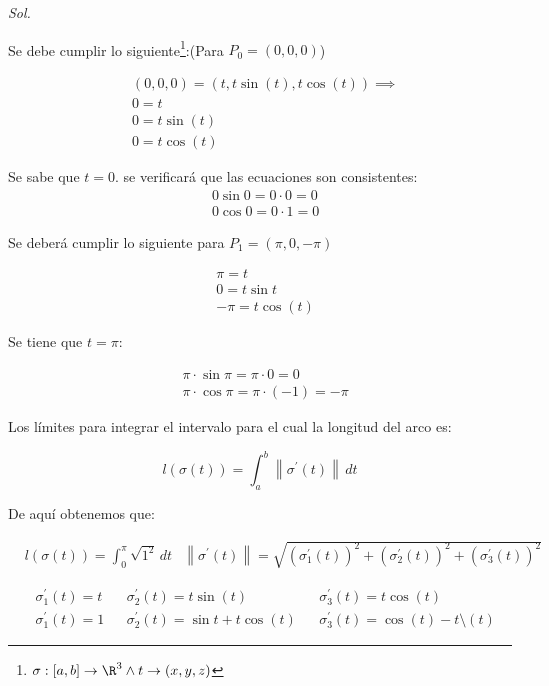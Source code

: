 \textit{ Sol. }

Se debe cumplir lo siguiente\footnote{$\sigma:\left[a,b\right]\to \R^3\land t\to (x,y,z)$}:(Para $P_0=(0,0,0)$)

\begin{align*}
	 & (0,0,0)=\left(t,t\sin{(t)},t\cos{(t)}\right)\implies \\
	 & 0=t                                                  \\
	 & 0=t\sin{(t)}                                         \\
	 & 0=t\cos{(t)}
\end{align*}

Se sabe que $t=0$. se verificará que las ecuaciones son consistentes:
\begin{align*}
	 & 0\sin{0}=0\cdot 0=0 \\
	 & 0\cos{0}=0\cdot 1=0
\end{align*}

Se deberá cumplir lo siguiente para $P_1=(\pi,0,-\pi)$

\begin{align*}
	 & \pi=t           \\
	 & 0=t\sin{t}      \\
	 & -\pi=t\cos{(t)}
\end{align*}

Se tiene que $t=\pi$:

\begin{align*}
	 & \pi\cdot \sin{\pi}=\pi\cdot 0=0      \\
	 & \pi\cdot \cos{\pi}=\pi\cdot(-1)=-\pi
\end{align*}

Los límites para integrar el intervalo para el cual la longitud del arco es:

\begin{equation}
	l\left(\sigma (t)\right)=\int_a^b \left\lVert \sigma^{\prime}(t)\right\rVert\, dt
\end{equation}

De aquí obtenemos que:

\begin{align*}
	 & l\left(\sigma (t)\right)=\int_0^\pi \sqrt{1^2}\, dt
	 & \left\lVert \sigma^{\prime}(t)\right\rVert=\sqrt{\left(\sigma_1^{\prime}(t)\right)^2+\left(\sigma_2^{\prime}(t)\right)^2+\left(\sigma_3^{\prime}(t)\right)^2}
\end{align*}

\begin{align*}
	 & \sigma_1^{\prime}(t)=t &  & \sigma_2^{\prime}(t)=t\sin{(t)}         &  & \sigma_3^{\prime}(t)=t\cos{(t)}                \\
	 & \sigma_1^{\prime}(t)=1 &  & \sigma_2^{\prime}(t)=\sin{t}+t\cos{(t)} &  & \sigma_3^{\prime}(t)=\cos{(t)}-t\setminus{(t)}
\end{align*}


